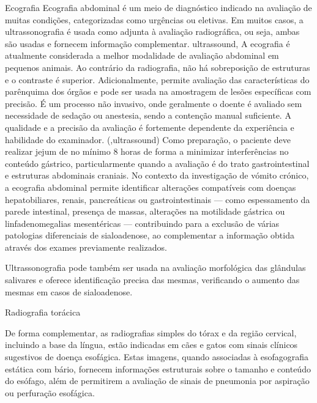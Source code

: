 Ecografia 
Ecografia abdominal é um meio de diagnóstico indicado na avaliação de muitas condições, categorizadas como urgências ou eletivas. \cite{penninck_atlas_2015} Em muitos casos, a ultrassonografia é usada como adjunta à avaliação radiográfica, ou seja, ambas são usadas e fornecem informação complementar. ultrassound,\cite{penninck_atlas_2015,mattoon_small_2015} A ecografia é atualmente considerada a melhor modalidade de avaliação abdominal em pequenos animais. \cite{barr_bsava_2011} Ao contrário da radiografia, não há sobreposição de estruturas e o contraste é superior. \cite{barr_bsava_2011} Adicionalmente, permite avaliação das características do parênquima dos órgãos e pode ser usada na amostragem de lesões específicas com precisão. \cite{barr_bsava_2011} É um processo não invasivo, onde geralmente o doente é avaliado sem necessidade de sedação ou anestesia, sendo a contenção manual suficiente. \cite{penninck_atlas_2015,seiler_acvr_2022} A qualidade e a precisão da avaliação é fortemente dependente da experiência e habilidade do examinador. (\cite{barr_bsava_2011,Gommeren2022,barr_bsava_2011,penninck_atlas_2015},ultrassound) Como preparação, o paciente deve realizar jejum de no mínimo 8 horas de forma a minimizar interferências no conteúdo gástrico, particularmente quando a avaliação é do trato gastrointestinal e estruturas abdominais craniais. \cite{seiler_acvr_2022} No contexto da investigação de vómito crónico, a ecografia abdominal permite identificar alterações compatíveis com doenças hepatobiliares, renais, pancreáticas ou gastrointestinais — como espessamento da parede intestinal, presença de massas, alterações na motilidade gástrica ou linfadenomegalias mesentéricas — contribuindo para a exclusão de várias patologias diferenciais de sialoadenose, ao complementar a informação obtida através dos exames previamente realizados. \cite{penninck_atlas_2015,mattoon_small_2015,barr_bsava_2011}


Ultrassonografia pode também ser usada na avaliação morfológica das glândulas salivares e oferece identificação precisa das mesmas, verificando o aumento das mesmas em casos de sialoadenose. \cite{boydell_sialadenosis_2000,Gil2018}

Radiografia torácica


De forma complementar, as radiografias simples do tórax e da região cervical, incluindo a base da língua, estão indicadas em cães e gatos com sinais clínicos sugestivos de doença esofágica. \cite{thrall_textbook_2018} Estas imagens, quando associadas à esofagografia estática com bário, fornecem informações estruturais sobre o tamanho e conteúdo do esófago, além de permitirem a avaliação de sinais de pneumonia por aspiração ou perfuração esofágica. \cite{thrall_textbook_2018}


